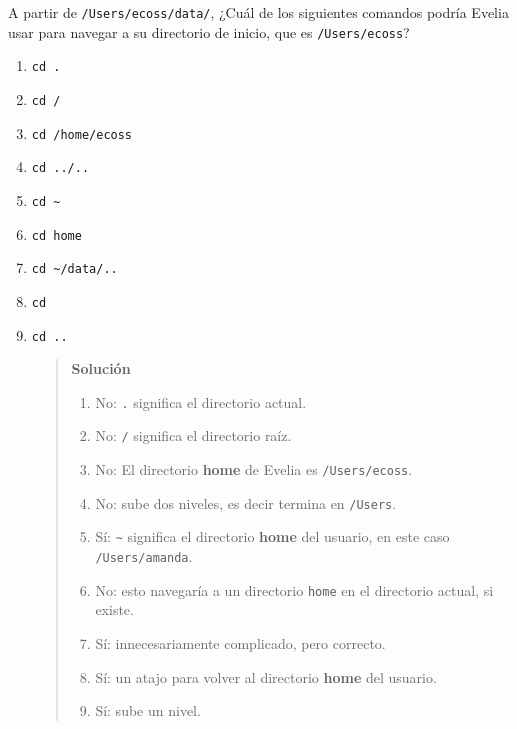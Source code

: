 \documentclass[
  spanish,
  12pt,
  letterpaper,
  DIV=11,
  numbers=noendperiod]{scrreprt}
\begin{document}
\begin{tcolorbox}[enhanced jigsaw, arc=.35mm, bottomrule=.15mm, bottomtitle=1mm, breakable, colback=white, colbacktitle=quarto-callout-note-color!10!white, colframe=quarto-callout-note-color-frame, coltitle=black, left=2mm, leftrule=.75mm, opacityback=0, opacitybacktitle=0.6, rightrule=.15mm, title=\textcolor{quarto-callout-note-color}{\faInfo}\hspace{0.5em}{Ejercicio 1}, titlerule=0mm, toprule=.15mm, toptitle=1mm]

A partir de \texttt{/Users/ecoss/data/}, ¿Cuál de los siguientes
comandos podría Evelia usar para navegar a su directorio de inicio, que
es \texttt{/Users/ecoss}?

\begin{enumerate}
\def\labelenumi{\arabic{enumi}.}
\item
  \texttt{cd\ .}
\item
  \texttt{cd\ /}
\item
  \texttt{cd\ /home/ecoss}
\item
  \texttt{cd\ ../..}
\item
  \texttt{cd\ \textasciitilde{}}
\item
  \texttt{cd\ home}
\item
  \texttt{cd\ \textasciitilde{}/data/..}
\item
  \texttt{cd}
\item
  \texttt{cd\ ..}

  \begin{quote}
  \textbf{Solución}

  \begin{enumerate}
  \def\labelenumii{\arabic{enumii}.}
  \item
    No: \texttt{.} significa el directorio actual.
  \item
    No: \texttt{/} significa el directorio raíz.
  \item
    No: El directorio \textbf{home} de Evelia es \texttt{/Users/ecoss}.
  \item
    No: sube dos niveles, es decir termina en \texttt{/Users}.
  \item
    Sí: \texttt{\textasciitilde{}} significa el directorio \textbf{home}
    del usuario, en este caso \texttt{/Users/amanda}.
  \item
    No: esto navegaría a un directorio \texttt{home} en el directorio
    actual, si existe.
  \item
    Sí: innecesariamente complicado, pero correcto.
  \item
    Sí: un atajo para volver al directorio \textbf{home} del usuario.
  \item
    Sí: sube un nivel.
  \end{enumerate}
  \end{quote}
\end{enumerate}

\end{tcolorbox}
\end{document}
